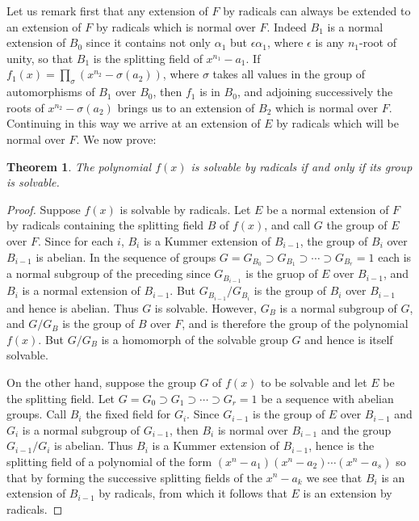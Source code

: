 \documentclass[10pt,leqno]{article}
\newtheorem{theo}{Theorem}
\theoremstyle{definition}
\begin{document}
Let us remark first that any extension of $F$ by radicals can always be extended to an extension of $F$ by radicals which is normal over $F$.
Indeed $B_1$ is a normal extension of $B_0$ since it contains not only $\alpha_1$ but $\epsilon \alpha_1$, where $\epsilon$ is any $n_1$-root of unity, so that $B_1$ is the splitting field of $x^{n_1} - a_1$.
If $f_1(x) = \prod_\sigma (x^{n_2} - \sigma(a_2))$, where $\sigma$ takes all values in the group of automorphisms of $B_1$ over $B_0$, then $f_1$ is in $B_0$, and adjoining successively the roots of $x^{n_2} - \sigma(a_2)$ brings us to an extension of $B_2$ which is normal over $F$.
Continuing in this way we arrive at an extension of $E$ by radicals which will be normal over $F$.
We now prove:

\begin{theo}
\label{theo:III.5}
The polynomial $f(x)$ is solvable by radicals if and only if its group is solvable.
\end{theo}


\begin{proof}
Suppose $f(x)$ is solvable by radicals.
Let $E$ be a normal extension of $F$ by radicals containing the splitting field $B$ of $f(x)$, and call $G$ the group of $E$ over $F$.
Since for each $i$, $B_i$ is a Kummer extension of $B_{i-1}$, the group of $B_i$ over $B_{i-1}$ is abelian.
In the sequence of groups $G = G_{B_0} \supset G_{B_1} \supset \cdots \supset G_{B_r} = 1$ each is a normal subgroup of the preceding since $G_{B_{i-1}}$ is the gruop of $E$ over $B_{i-1}$, and $B_i$ is a normal extension of $B_{i-1}$.
But $G_{B_{i-1}}/G_{B_i}$ is the group of $B_i$ over $B_{i-1}$ and hence is abelian.
Thus $G$ is solvable.
However, $G_B$ is a normal subgroup of $G$, and $G/G_B$ is the group of $B$ over $F$, and is therefore the group of the polynomial $f(x)$.
But $G/G_B$ is a homomorph of the solvable group $G$ and hence is itself solvable.

On the other hand, suppose the group $G$ of $f(x)$ to be solvable and let $E$ be the splitting field.
Let $G = G_0 \supset G_1 \supset \cdots \supset G_r = 1$ be a sequence with abelian groups.
Call $B_i$ the fixed field for $G_i$.
Since $G_{i-1}$ is the group of $E$ over $B_{i-1}$ and $G_i$ is a normal subgroup of $G_{i-1}$, then $B_i$ is normal over $B_{i-1}$ and the group $G_{i-1} / G_i$ is abelian.
Thus $B_i$ is a Kummer extension of $B_{i-1}$, hence is the splitting field of a polynomial of the form $(x^n - a_1) (x^n - a_2) \cdots (x^n - a_s)$ so that by forming the successive splitting fields of the $x^n - a_k$ we see that $B_i$ is an extension of $B_{i-1}$ by radicals, from which it follows that $E$ is an extension by radicals.
\end{proof}
\end{document}
